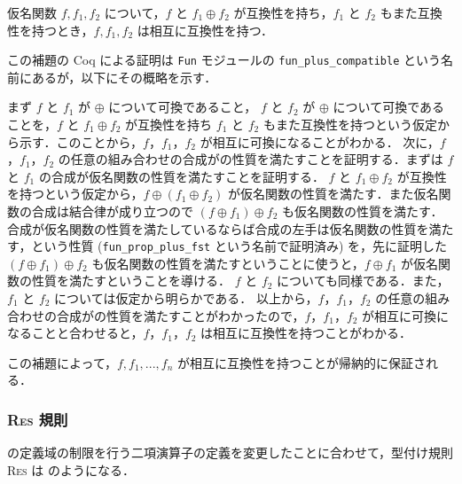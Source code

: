 \begin{lem}
  仮名関数 $f, f_1, f_2$ について，$f$ と $f_1 \oplus f_2$ が互換性を持ち，$f_1$ と $f_2$ もまた互換性を持つとき，$f, f_1, f_2$ は相互に互換性を持つ．
  \label{lem:compatible}
\end{lem}

この補題の Coq による証明は \texttt{Fun} モジュールの \texttt{fun\_plus\_compatible} という名前にあるが，以下にその概略を示す．

まず $f$ と $f_1$ が $\oplus$ について可換であること， $f$ と $f_2$ が $\oplus$ について可換であることを，$f$ と $f_1 \oplus f_2$ が互換性を持ち $f_1$ と $f_2$ もまた互換性を持つという仮定から示す．このことから，$f$，$f_1$，$f_2$ が相互に可換になることがわかる．
次に，$f$，$f_1$，$f_2$ の任意の組み合わせの合成が\tmp の性質を満たすことを証明する．まずは $f$ と $f_1$ の合成が仮名関数の性質を満たすことを証明する．
$f$ と $f_1 \oplus f_2$ が互換性を持つという仮定から，$f \oplus (f_1 \oplus f_2)$ が仮名関数の性質を満たす．また仮名関数の合成は結合律が成り立つので $(f \oplus f_1) \oplus f_2$ も仮名関数の性質を満たす．
合成が仮名関数の性質を満たしているならば合成の左手は仮名関数の性質を満たす，という性質 (\texttt{fun\_prop\_plus\_fst} という名前で証明済み) を，先に証明した $(f \oplus f_1) \oplus f_2$ も仮名関数の性質を満たすということに使うと，$f \oplus f_1$ が仮名関数の性質を満たすということを導ける．
$f$ と $f_2$ についても同様である．また，$f_1$ と $f_2$ については仮定から明らかである．
以上から，$f$，$f_1$，$f_2$ の任意の組み合わせの合成が\tmp の性質を満たすことがわかったので，$f$，$f_1$，$f_2$ が相互に可換になることと合わせると，$f$，$f_1$，$f_2$ は相互に互換性を持つことがわかる．

この補題によって，$f, f_1, ... , f_n$ が相互に互換性を持つことが帰納的に保証される．%



\subsubsection{\textsc{Res} 規則}

\tmp の定義域の制限を行う二項演算子の定義を変更したことに合わせて，型付け規則 \textsc{Res} は  のようになる．

